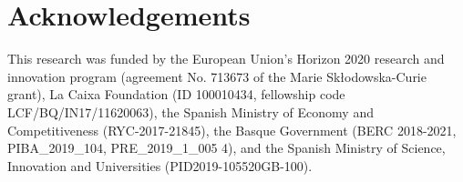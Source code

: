 \documentclass[preprint]{elsarticle}
\begin{document}
\section{Acknowledgements}

This research was funded by the European Union’s Horizon 2020 research and innovation program (agreement No. 713673 of the Marie Skłodowska-Curie grant), La Caixa Foundation (ID 100010434, fellowship code LCF/BQ/IN17/11620063), the Spanish Ministry of Economy and Competitiveness (RYC-2017-21845), the Basque Government (BERC 2018-2021, PIBA\_2019\_104, PRE\_2019\_1\_005 4), and the Spanish Ministry of Science, Innovation and Universities (PID2019-105520GB-100).



% 
\end{document}
